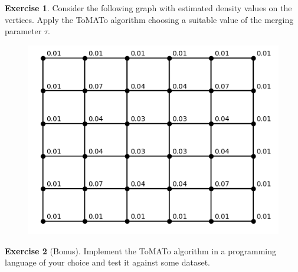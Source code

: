 \documentclass{article}
\theoremstyle{plain}
\theoremstyle{definition}
\newtheorem{exercise}{Exercise}
\begin{document}
\begin{exercise}
Consider the following graph with estimated density values on the vertices. Apply the ToMATo algorithm choosing a suitable value of the merging parameter $\tau$. 
\begin{figure}[h!]
\centering
\includegraphics[scale=0.5]{graphexercise}
\end{figure}
\end{exercise}
%
\begin{exercise}[Bonus] Implement the ToMATo algorithm in a programming language of your choice and test it against some dataset.
\end{exercise}
\end{document}

